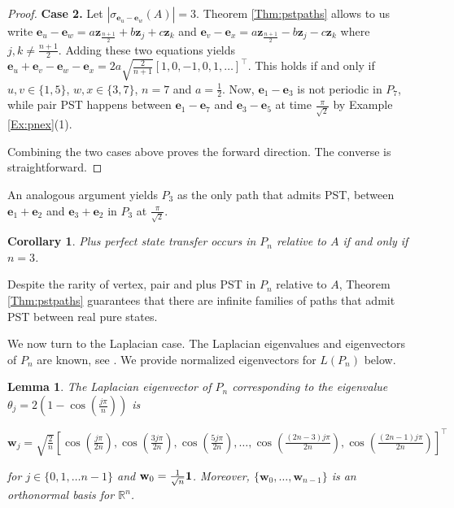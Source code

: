 \documentclass[11pt]{article}
\newtheorem{lemma}[theorem]{Lemma}
\newtheorem{corollary}[theorem]{Corollary}
\newcommand{\ones}{{\bf{1}}}
\newcommand{\be}{\mathbf e}
\newcommand{\bz}{\mathbf z}
\newcommand{\bw}{\mathbf w}
\def\R{\mathbb{R}}
\begin{document}
\begin{proof}
\noindent \textbf{Case 2.} Let $|\sigma_{\be_u-\be_w}(A)|=3$. Theorem \ref{Thm:pstpaths} allows to us write $\be_u-\be_w=a\bz_{\frac{n+1}{2}}+b\bz_j+c\bz_{k}$ and $\be_v-\be_x=a\bz_{\frac{n+1}{2}}-b\bz_j-c\bz_{k}$ where $j,k\neq \frac{n+1}{2}$. Adding these two equations yields $\be_u+\be_v-\be_w-\be_x=2a\sqrt{\frac{2}{n+1}}[1,0,-1,0,1,\ldots]^\top$. This holds if and only if $u,v\in \{1,5\}$, $w,x\in \{3,7\}$, $n=7$ and $a=\frac{1}{2}$. Now, $\be_1-\be_3$ is not periodic in $P_7$, while pair PST happens between $\be_1-\be_7$ and $\be_3-\be_{5}$ at time $\frac{\pi}{\sqrt{2}}$ by Example \ref{Ex:pnex}(1). 

Combining the two cases above proves the forward direction. The converse is straightforward.
\end{proof}


An analogous argument yields $P_3$ as the only path that admits PST, between $\be_1+\be_2$ and $\be_3+\be_{2}$ in $P_3$ at $\frac{\pi}{\sqrt{2}}$.

\begin{corollary}
\label{Cor:pluspstpn}
Plus perfect state transfer occurs in $P_n$ relative to $A$ if and only if $n=3$. %
\end{corollary}

Despite the rarity of vertex, pair and plus PST in $P_n$ relative to $A$, Theorem \ref{Thm:pstpaths} guarantees that there are infinite families of paths that admit PST between real pure states.

We now turn to the Laplacian case. The Laplacian eigenvalues and eigenvectors of $P_n$ are known, see \cite[Section 1.4.4]{brouwer2011spectra}. We provide normalized eigenvectors for $L(P_n)$ below.

\begin{lemma}
\label{Lem:pnevalL}
The Laplacian eigenvector of $P_n$ corresponding to the eigenvalue $\theta_j=2\left(1-\cos\left(\frac{j\pi}{n}\right)\right)$ is
\begin{center}
$\bw_j=\sqrt{\frac{2}{n}}\left[\cos\left(\frac{j\pi}{2n}\right), \cos\left(\frac{3j\pi}{2n}\right),\cos\left(\frac{5j\pi}{2n}\right),\ldots,\cos\left(\frac{(2n-3)j\pi}{2n}\right), \cos\left(\frac{(2n-1)j\pi}{2n}\right)\right]^\top$
\end{center}
for $j\in\{0,1,\ldots n-1\}$ and $\bw_0=\frac{1}{\sqrt{n}}\ones$. Moreover, $\{\bw_0,\ldots,\bw_{n-1}\}$ is an orthonormal basis for $\R^n$.
\end{lemma}
\end{document}
